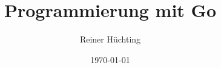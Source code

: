 \documentclass{beamer}
\title{Programmierung mit Go}
\author{Reiner Hüchting}
\date{\today}
\begin{document}
\begin{frame}

    \maketitle

\end{frame}
\end{document}
